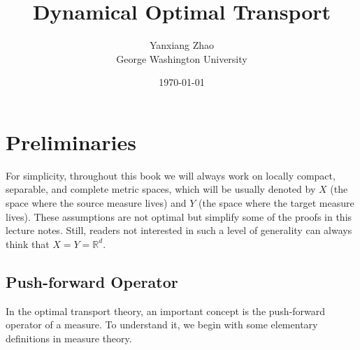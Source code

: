 \documentclass[11pt]{book}
\title{\bf Dynamical Optimal Transport}    %
\author{Yanxiang Zhao \\ George Washington University}              %
\date{\today}
\begin{document}
\pagestyle{fancy}

\frontmatter                            %
\maketitle                              %
\tableofcontents                        %
\mainmatter  



\fancyfoot[C]{\thepage}

\leftmargin=0.1cm

\fancyhf{}
\fancyhead[LE]{\leftmark}
\fancyhead[RE]{\rightmark}
\fancyhead[LO]{\leftmark}
\fancyhead[RO]{\rightmark}
\fancyfoot[LE,RO]{\thepage}







\chapter[Preliminaries]{Preliminaries}\label{chapter:Preliminaries}




For simplicity, throughout this book we will always work on locally compact, separable, and complete metric spaces, which will be usually denoted by \(X\) (the space where the source measure lives) and \(Y\) (the space where the target measure lives). These assumptions are not optimal but simplify some of the proofs in this lecture notes. Still, readers not interested in such a level of generality can always think that \(X = Y = \mathbb{R}^d\).


\section[Push-forward]{Push-forward Operator}

In the optimal transport theory, an important concept is the push-forward operator of a measure. To understand it, we begin with some elementary definitions in measure theory.
\end{document}
